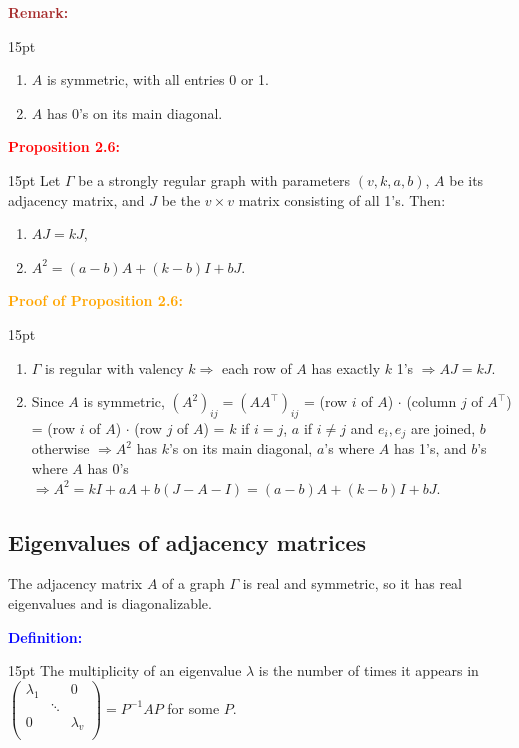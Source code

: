\documentclass[12pt]{article}
\newcommand{\noparskip}{\vspace{-\parskip}}
\newenvironment{points}
	{\begin{enumerate}[label = (\arabic*)]}
	{\end{enumerate}}
\newenvironment{dent}
	{\begin{adjustwidth}{15pt}{}\noparskip}
	{\end{adjustwidth}}
\newenvironment{result}[1]
	{\textcolor{Red}{\textbf{#1:}}\begin{dent}}
	{\end{dent}}
\newenvironment{proof}[1]
	{\textcolor{Orange}{\textbf{Proof of #1:}}\begin{dent}}
	{\end{dent}}
\newenvironment{definition}
	{\textcolor{Blue}{\textbf{Definition:}}\begin{dent}}
	{\end{dent}}
\newenvironment{remark}
	{\textcolor{Brown}{\textbf{Remark:}}\begin{dent}}
	{\end{dent}}
\renewcommand{\implies}{\Rightarrow}
\begin{document}
\begin{remark}
\begin{points}
\item $A$ is symmetric, with all entries 0 or 1.
\item $A$ has 0's on its main diagonal.
\end{points}
\end{remark}

\begin{result}{Proposition 2.6}
Let $\Gamma$ be a strongly regular graph with parameters $(v, k, a, b)$, $A$ be its adjacency matrix, and $J$ be the $v \times v$ matrix consisting of all 1's. Then:
\noparskip
\begin{points}
\item $AJ = kJ$,
\item $A^2 = (a - b)A + (k - b)I + bJ$.
\end{points}
\end{result}

\begin{proof}{Proposition 2.6}
\begin{points}
\item $\Gamma$ is regular with valency $k \implies$ each row of $A$ has exactly $k$ 1's $\implies AJ = kJ$.
\item Since $A$ is symmetric, $(A^2)_{ij} = (A A^\top)_{ij}$ = (row $i$ of $A$) $\cdot$ (column $j$ of $A^\top$) = (row $i$ of $A$) $\cdot$ (row $j$ of $A$) = $k$ if $i = j$, $a$ if $i \ne j$ and $e_i, e_j$ are joined, $b$ otherwise $\implies A^2$ has $k$'s on its main diagonal, $a$'s where $A$ has 1's, and $b$'s where $A$ has 0's $\implies A^2 = kI + aA + b(J - A - I) = (a - b)A + (k - b)I + bJ$.
\end{points}
\end{proof}

\subsection{Eigenvalues of adjacency matrices}

The adjacency matrix $A$ of a graph $\Gamma$ is real and symmetric, so it has real eigenvalues and is diagonalizable.

\begin{definition}
The multiplicity of an eigenvalue $\lambda$ is the number of times it appears in $\begin{pmatrix}
\lambda_1 &           &             0 \\
                & \ddots &                \\
             0 &           & \lambda_v \\
\end{pmatrix} = P^{-1}AP$ for some $P$.
\end{definition}
\end{document}
